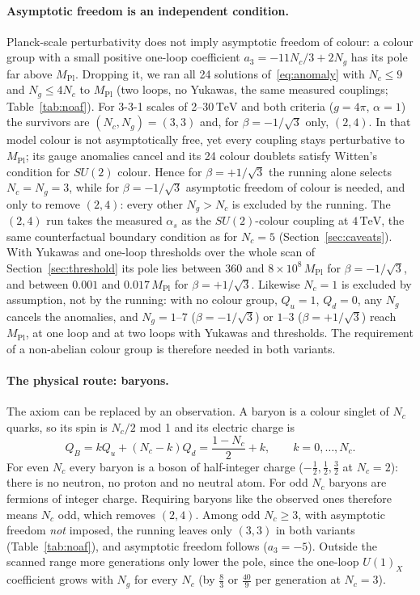 \documentclass[11pt,a4paper]{article}
\newcommand{\Nc}{N_c}
\newcommand{\Ng}{N_g}
\newcommand{\MPl}{M_{\mathrm{Pl}}}
\newcommand{\TeV}{\,\mathrm{TeV}}
\begin{document}
\paragraph{Asymptotic freedom is an independent condition.}
Planck-scale perturbativity does not imply asymptotic freedom of colour: a colour group
with a small positive one-loop coefficient $a_3=-11\Nc/3+2\Ng$ has its pole far above
$\MPl$. Dropping it, we ran all 24 solutions of~\eqref{eq:anomaly} with $\Nc\le9$ and
$\Ng\le4\Nc$ to $\MPl$ (two loops, no Yukawas, the same measured couplings;
Table~\ref{tab:noaf}). For 3-3-1 scales of 2--$30\TeV$ and both criteria ($g=4\pi$,
$\alpha=1$) the survivors are $(\Nc,\Ng)=(3,3)$ and, for $\beta=-1/\sqrt3$ only, $(2,4)$.
In that model colour is not asymptotically free, yet every coupling stays perturbative to
$\MPl$; its gauge anomalies cancel and its 24 colour doublets satisfy Witten's condition
for $SU(2)$ colour. Hence for $\beta=+1/\sqrt3$ the running alone selects $\Nc=\Ng=3$,
while for $\beta=-1/\sqrt3$ asymptotic freedom of colour is needed, and only to remove
$(2,4)$: every other $\Ng>\Nc$ is excluded by the running. The $(2,4)$ run takes the
measured $\alpha_s$ as the $SU(2)$-colour coupling at $4\TeV$, the same counterfactual
boundary condition as for $\Nc=5$ (Section~\ref{sec:caveats}). With Yukawas and one-loop
thresholds over the whole scan of Section~\ref{sec:threshold} its pole lies between $360$
and $8\times10^{8}\,\MPl$ for $\beta=-1/\sqrt3$, and between $0.001$ and $0.017\,\MPl$ for
$\beta=+1/\sqrt3$.
Likewise $\Nc=1$ is excluded by assumption, not by the running: with no colour group,
$Q_u=1$, $Q_d=0$, any $\Ng$ cancels the anomalies, and $\Ng=1$--$7$
($\beta=-1/\sqrt3$) or $1$--$3$ ($\beta=+1/\sqrt3$) reach $\MPl$, at one loop and at two
loops with Yukawas and thresholds. The requirement of a
non-abelian colour group is therefore needed in both variants.

\paragraph{The physical route: baryons.}
The axiom can be replaced by an observation. A baryon is a colour singlet of $\Nc$ quarks,
so its spin is $\Nc/2$ mod 1 and its electric charge is
\begin{equation}
  Q_B=kQ_u+(\Nc-k)Q_d=\frac{1-\Nc}{2}+k,\qquad k=0,\dots,\Nc .
\end{equation}
For even $\Nc$ every baryon is a boson of half-integer charge ($-\tfrac12,\tfrac12,\tfrac32$
at $\Nc=2$): there is no neutron, no proton and no neutral atom. For odd $\Nc$ baryons are
fermions of integer charge. Requiring baryons like the observed ones therefore means $\Nc$
odd, which removes $(2,4)$. Among odd $\Nc\ge3$, with asymptotic freedom \emph{not}
imposed, the running leaves only $(3,3)$ in both variants (Table~\ref{tab:noaf}), and
asymptotic freedom follows ($a_3=-5$). Outside the scanned range more generations only
lower the pole, since the one-loop $U(1)_X$ coefficient grows with $\Ng$ for every $\Nc$
(by $\tfrac83$ or $\tfrac{40}9$ per generation at $\Nc=3$).
\end{document}
